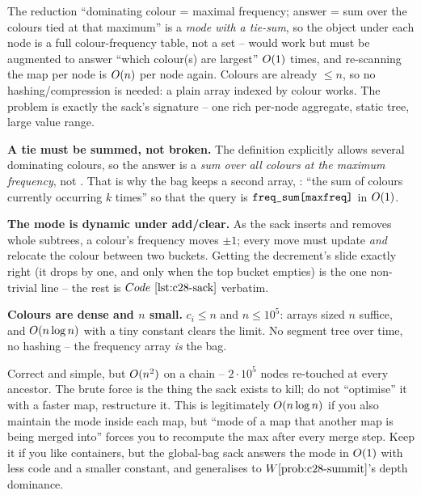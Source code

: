 The reduction ``dominating colour = maximal frequency; answer = sum over the
colours tied at that maximum'' is a \emph{mode with a tie-sum}, so the object
under each node is a full colour-frequency table, not a set -- 
would work but must be augmented to answer ``which colour(s) are largest''
\(O(1)\) times, and re-scanning the map per node is \(O(n)\) per node
again.  Colours are already \(\le n\), so no hashing/compression is needed: a
plain array indexed by colour works.  The problem is exactly the sack's
signature -- one rich per-node aggregate, static tree, large value range.

\begin{observation}
\textbf{A tie must be summed, not broken.} The definition explicitly allows
several dominating colours, so the answer is a \emph{sum over all colours at the
maximum frequency}, not .  That is why the bag keeps a second
array, : ``the sum of colours currently occurring \(k\) times''
so that the query is \(\texttt{freq\_sum[maxfreq]}\) in \(O(1)\).
\end{observation}
\begin{observation}
\textbf{The mode is dynamic under add/clear.} As the sack inserts and removes
whole subtrees, a colour's frequency moves \(\pm1\); every move must update
 \emph{and} relocate the colour between two 
buckets.  Getting the decrement's  slide exactly right (it drops
by one, and only when the top bucket empties) is the one non-trivial line --
the rest is \(\coderef{c28-sack}\) verbatim.
\end{observation}
\begin{observation}
\textbf{Colours are dense and \(n\) small.} \(c_i\le n\) and \(n\le10^5\):
arrays sized \(n\) suffice, and \(O(n\log n)\) with a tiny constant clears
the limit.  No segment tree over time, no hashing -- the frequency array
\emph{is} the bag.
\end{observation}

\begin{thinkbox}
{Correct and simple, but \(O(n^2)\) on a chain -- \(2\cdot10^5\) nodes
re-touched at every ancestor.  The brute force is the thing the sack exists to
kill; do not ``optimise'' it with a faster map, restructure it.}
{This is legitimately \(O(n\log n)\) if you also maintain the mode inside
each map, but ``mode of a map that another map is being merged into'' forces you
to recompute the max after every merge step.  Keep it if you like containers,
but the global-bag sack answers the mode in \(O(1)\) with less code and a
smaller constant, and generalises to \(\probref{c28-summit}\)'s depth dominance.}
\end{thinkbox}

